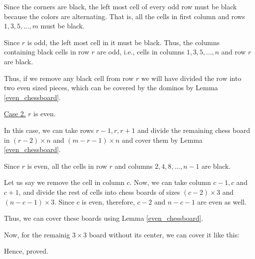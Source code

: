 \begin{solution}[b]
	Since the corners are black, the left most cell of every odd row must be black because the colors are alternating. That is, all the cells in first column and rows $1, 3, 5, ..., m$ must be black.

	Since $r$ is odd, the left most cell in it must be black.
	Thus, the columns containing black cells in row $r$ are odd, i.e., cells in columns $1, 3, 5, ..., n$ and row $r$ are black.

	Thus, if we remove any black cell from row $r$
	we will have divided the row into two even sized pieces, 
	which can be covered by the dominos by Lemma \ref{even_chessboard}.

	\bigbreak
	\underline{Case 2.} $r$ is even.

	In this case, we can take rows $r-1, r, r+1$ 
	and divide the remaining chess board in $(r-2) \times n$ and $(m-r-1) \times n$ 
	and cover them by Lemma \ref{even_chessboard}.

	Since $r$ is even, all the cells in row $r$ and columns $2, 4, 8, ..., n-1$ are black.
	
	Let us say we remove the cell in column $c$. Now, we can take column $c-1, c$ and $c+1$, 
	and divide the rest of cells into chess boards of sizes $(c-2)\times 3$ and $(n-c-1) \times 3$. Since $c$ is even, therefore, $c-2$ and $n-c-1$ are even as well.
	
	Thus, we can cover these boards using Lemma \ref{even_chessboard}.

	Now, for the remainig $3 \times 3$ board without its center, we can cover it like this:
	\bigbreak


		Hence, proved.

\end{solution}

